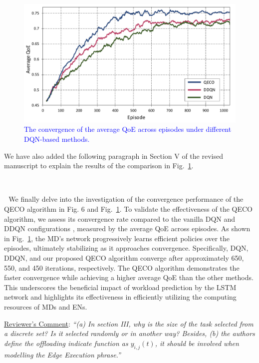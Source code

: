 \documentclass[12pt,draftclsnofoot,onecolumn]{IEEEtran}
\newcommand{\rev}[1]{{\color{blue}#1}} %
\newcommand{\rev}[1]{#1}
\newenvironment{my}[2]%
{\begin{list}{}%
{\setlength{\rightmargin}{#1}\setlength{\leftmargin}{#2}}%


 \item[]{}

} {\end{list}}
\begin{document}
\begin{enumerate}
\setcounter{figure}{6}

\begin{figure}[H]
	\captionsetup{name=Fig.}
	\centering
	\includegraphics[width=.6\linewidth]{m1}
	\vspace*{-3mm}
	\caption{\textcolor{blue}{The convergence of the average QoE across episodes under different DQN-based methods.}}
	\vspace*{-3mm}
	\label{chart000}
\end{figure}

We have also added the following paragraph in Section V of the revised manuscript to explain the results of the comparison in Fig.~\ref{chart000}.
		\begin{my}{1cm}{1cm}
	\rev{
		{\

	\,\,\,\,We finally delve into the investigation of the convergence performance of the QECO algorithm in Fig. 6 and Fig.~\ref{chart000}. To validate the effectiveness of the QECO algorithm, we assess its convergence rate compared to the vanilla DQN and DDQN configurations \cite{van2016deep}, measured by the average QoE across episodes. As shown in Fig.~\ref{chart000}, the MD's network progressively learns efficient policies over the episodes, ultimately stabilizing as it approaches convergence. Specifically, DQN, DDQN, and our proposed QECO algorithm converge after approximately 650, 550, and 450 iterations, respectively. 
	The QECO algorithm demonstrates the faster convergence while achieving a higher average QoE than the other methods. This underscores the beneficial impact of workload prediction by the LSTM network and highlights its effectiveness in efficiently utilizing the computing resources of MDs and ENs.
}}
\end{my}


\vspace{6mm}

\item \underline{Reviewer's Comment}: 
\textit{``(a) In section III, why is the size of the task selected from a discrete set? Is it selected randomly or in another way? Besides, (b) the authors define the offloading indicate function as $y_{i,j}(t)$, it should be involved when modelling the Edge Execution phrase.''} \newline


\end{enumerate}
\end{document}
